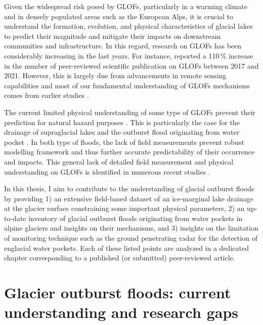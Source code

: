 Given the widespread risk posed by GLOFs, particularly in a warming climate and in densely populated areas such as the European Alps, it is crucial to understand the formation, evolution, and physical characteristics of glacial lakes to predict their magnitude and mitigate their impacts on downstream communities and infrastructure. In this regard, research on GLOFs has been considerably increasing in the last years. For instance, \cite{Emmer&al2022} reported a 110\,\% increase in the number of peer-reviewed scientific publication on GLOFs between 2017 and 2021. However, this is largely due from advancements in remote sensing capabilities and most of our fundamental understanding of GLOFs mechanisms comes from earlier studies \citep[see][for a review]{Bjornsson2010}.

The current limited physical understanding of some type of GLOFs prevent their prediction for natural hazard purposes \citep{Emmer&al2022}. This is particularly the case for the drainage of supraglacial lakes \citep[e.g.][]{Vincent&al2010} and the outburst flood originating from water pocket \citep[e.g.][]{Haeberli1983}. In both type of floods, the lack of field measurements prevent robust modelling framework and thus further accurate predictability of their occurrence and impacts. This general lack of detailed field measurement and physical understanding on GLOFs is identified in numerous recent studies \citep{Zhang&al2024, Carrivick&Tweed2016, Veh&al2022}.

In this thesis, I aim to contribute to the understanding of glacial outburst floods by providing 1) an extensive field-based dataset of an ice-marginal lake drainage at the glacier surface constraining some important physical parameters, 2) an up-to-date inventory of glacial outburst floods originating from water pockets in alpine glaciers and insights on their mechanisms, and 3) insights on the limitation of monitoring technique such as the ground penetrating radar for the detection of englacial water pockets. Each of these listed points are analyzed in a dedicated chapter corresponding to a published (or submitted) peer-reviewed article.


\section{Glacier outburst floods: current understanding and research gaps} 

